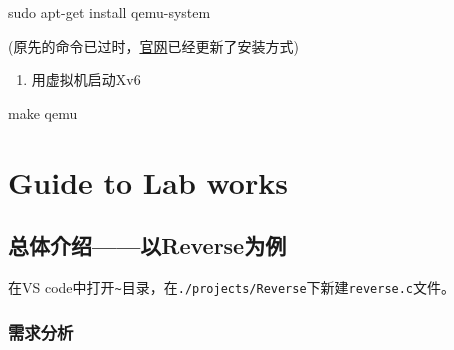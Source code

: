 \documentclass[
]{article}
\newenvironment{Shaded}{}{}
\newcommand{\FunctionTok}[1]{\textcolor[rgb]{0.02,0.16,0.49}{#1}}
\newcommand{\NormalTok}[1]{#1}
\begin{document}
\begin{Shaded}
	\begin{Highlighting}[]
		\FunctionTok{sudo}\NormalTok{ apt{-}get install qemu{-}system}
	\end{Highlighting}
\end{Shaded}

(原先的命令已过时，\href{https://www.qemu.org/download/\#linux}{官网}已经更新了安装方式)

\begin{enumerate}[resume]
	\def\labelenumi{\arabic{enumi}.}
	\item
	      用虚拟机启动Xv6
\end{enumerate}

\begin{Shaded}
	\begin{Highlighting}[]
		\FunctionTok{make}\NormalTok{ qemu}
	\end{Highlighting}
\end{Shaded}

\section{Guide to Lab works}\label{guide-to-lab-works}

\subsection{总体介绍------以Reverse为例}\label{ux603bux4f53ux4ecbux7ecd------ux4ee5reverseux4e3aux4f8b}

在VS
code中打开\texttt{\textasciitilde{}}目录，在\texttt{./projects/Reverse}下新建\texttt{reverse.c}文件。

\subsubsection{需求分析}\label{ux9700ux6c42ux5206ux6790}
\end{document}
